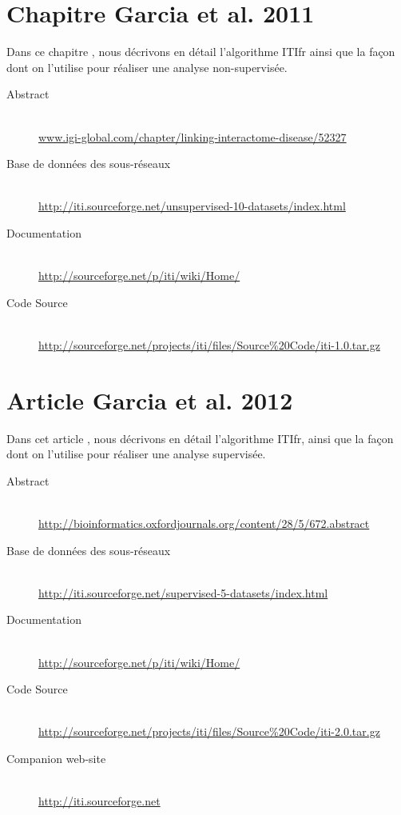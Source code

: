 		\section{\textcolor{white!15!black}{Chapitre Garcia et al. 2011}}\label{app:Garcia2011}
			Dans ce chapitre \citet{Garcia2011}, nous décrivons en détail l'algorithme \acs{ITIfr} ainsi que la façon dont on l'utilise pour réaliser une analyse non-supervisée.

			\begin{description}
				\item [Abstract]                            \hfill \\
					\url{www.igi-global.com/chapter/linking-interactome-disease/52327}
				\item [Base de données des sous-réseaux]    \hfill \\
					\url{http://iti.sourceforge.net/unsupervised-10-datasets/index.html}
				\item [Documentation]                       \hfill \\
					\url{http://sourceforge.net/p/iti/wiki/Home/}
				\item [Code Source]                         \hfill \\
					\url{http://sourceforge.net/projects/iti/files/Source%20Code/iti-1.0.tar.gz}
			\end{description}

			

		\section{\textcolor{white!15!black}{Article Garcia et al. 2012}}\label{app:Garcia2012}
			Dans cet article \citet{Garcia2012}, nous décrivons en détail l'algorithme \acs{ITIfr}, ainsi que la façon dont on l'utilise pour réaliser une analyse supervisée.

				\begin{description}
					\item [Abstract]    \hfill \\
						\url{http://bioinformatics.oxfordjournals.org/content/28/5/672.abstract}
					\item [Base de données des sous-réseaux]    \hfill \\
						\url{http://iti.sourceforge.net/supervised-5-datasets/index.html}
					\item [Documentation]                       \hfill \\
						\url{http://sourceforge.net/p/iti/wiki/Home/}
					\item [Code Source]                         \hfill \\
						\url{http://sourceforge.net/projects/iti/files/Source%20Code/iti-2.0.tar.gz}
					\item [Companion web-site]    \hfill \\
						\url{http://iti.sourceforge.net}
				\end{description}

